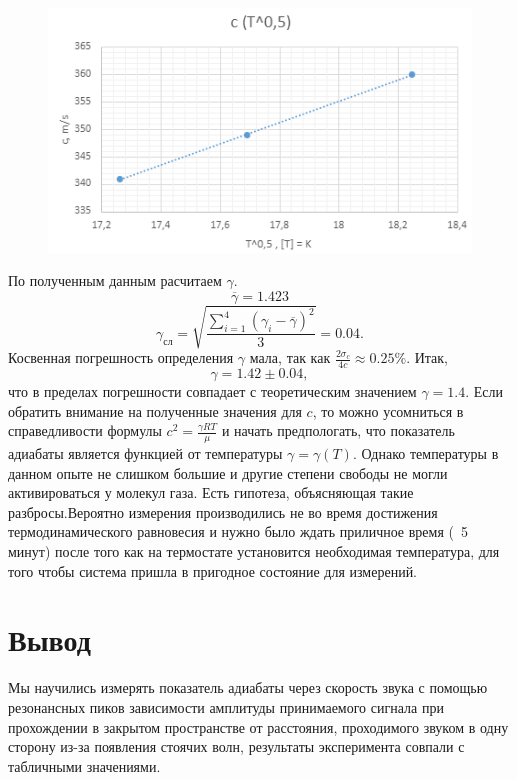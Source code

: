 \documentclass[12pt,a4paper]{article}
\begin{document}
\begin{figure}[h]
    \centering
    \begin{center}
    \end{center}
    \includegraphics[width=10 cm]{ctplot340.PNG}
    \label{fig:ctplot340}
\end{figure}
\newpage

По полученным данным расчитаем $\gamma$.
$$\overline{\gamma} = 1.423$$
$$\gamma_{сл} = \sqrt{\frac{\sum_{i=1}^{4} (\gamma_{i}-\overline{\gamma})^2}{3}} = 0.04 .$$
Косвенная погрешность определения $\gamma$ мала, так как $\frac{2\sigma_c}{4c} \approx 0.25 \%.$
Итак, $$\gamma = 1.42 \pm 0.04 ,$$ что в пределах погрешности совпадает  с теоретическим значением $\gamma = 1.4 .$
Если обратить внимание на полученные значения для $c$, то можно усомниться в справедливости формулы $c^2 = \frac{\gamma R T}{\mu}$ и начать предпологать, что показатель адиабаты является функцией от температуры $\gamma = \gamma(T)$. Однако температуры в данном опыте не слишком большие и другие степени свободы не могли активироваться у молекул газа. Есть гипотеза, объясняющая такие разбросы.Вероятно измерения производились не во время достижения термодинамического равновесия и нужно было ждать приличное время (~5 минут) после того как на термостате установится необходимая температура, для того чтобы система пришла в пригодное состояние для измерений.

\section{Вывод}
Мы научились измерять показатель адиабаты через скорость звука с помощью резонансных пиков зависимости амплитуды принимаемого сигнала при прохождении в закрытом пространстве от расстояния, проходимого звуком в одну сторону из-за появления стоячих волн, результаты эксперимента совпали с табличными значениями. 
\end{document}
